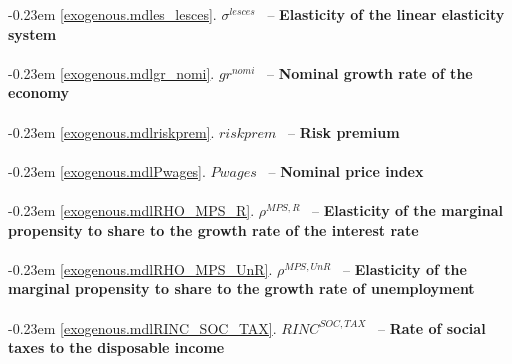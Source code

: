 \documentclass[12pt]{article}
\numberwithin{equation}{section}
\begin{document}
\noindent \kern-0.23em \noindent \begingroup {} \label{exogenous.mdles_lesces}\ref{exogenous.mdles_lesces}.
         
        \ensuremath{\sigma^{lesces}}~ \endgroup -- \noindent \textbf{Elasticity of the linear elasticity system}  \\ \\[-8pt]


\noindent \kern-0.23em \noindent \begingroup {} \label{exogenous.mdlgr_nomi}\ref{exogenous.mdlgr_nomi}.
         
        \ensuremath{gr^{nomi}}~ \endgroup -- \noindent \textbf{Nominal growth rate of the economy}  \\ \\[-8pt]


\noindent \kern-0.23em \noindent \begingroup {} \label{exogenous.mdlriskprem}\ref{exogenous.mdlriskprem}.
         
        \ensuremath{riskprem}~ \endgroup -- \noindent \textbf{Risk premium}  \\ \\[-8pt]


\noindent \kern-0.23em \noindent \begingroup {} \label{exogenous.mdlPwages}\ref{exogenous.mdlPwages}.
         
        \ensuremath{Pwages}~ \endgroup -- \noindent \textbf{Nominal price index}  \\ \\[-8pt]


\noindent \kern-0.23em \noindent \begingroup {} \label{exogenous.mdlRHO_MPS_R}\ref{exogenous.mdlRHO_MPS_R}.
         
        \ensuremath{\rho^{MPS,R}}~ \endgroup -- \noindent \textbf{Elasticity of the marginal propensity to share to the growth rate of the interest rate}  \\ \\[-8pt]


\noindent \kern-0.23em \noindent \begingroup {} \label{exogenous.mdlRHO_MPS_UnR}\ref{exogenous.mdlRHO_MPS_UnR}.
         
        \ensuremath{\rho^{MPS,UnR}}~ \endgroup -- \noindent \textbf{Elasticity of the marginal propensity to share to the growth rate of unemployment}  \\ \\[-8pt]


\noindent \kern-0.23em \noindent \begingroup {} \label{exogenous.mdlRINC_SOC_TAX}\ref{exogenous.mdlRINC_SOC_TAX}.
         
        \ensuremath{RINC^{SOC,TAX}}~ \endgroup -- \noindent \textbf{Rate of social taxes to the disposable income}  \\ \\[-8pt]
\end{document}
